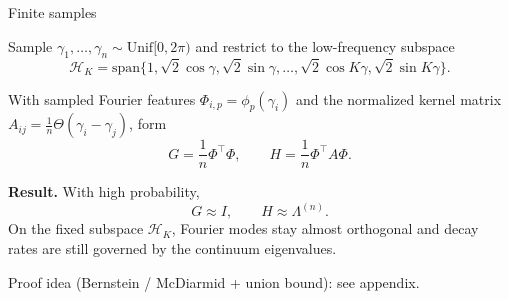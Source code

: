 \documentclass[10pt,aspectratio=169]{beamer}
\begin{document}
\begin{frame}{Finite samples}

	Sample \(\gamma_1,\dots,\gamma_n\sim\mathrm{Unif}[0,2\pi)\) and restrict to the low-frequency subspace
	\[
		\mathcal H_K=\mathrm{span}\{1,\sqrt{2}\cos\gamma,\sqrt{2}\sin\gamma,\ldots,
		\sqrt{2}\cos K\gamma,\sqrt{2}\sin K\gamma\}.
	\]

	\pause
	With sampled Fourier features \(\Phi_{i,p}=\phi_p(\gamma_i)\) and the normalized kernel matrix
	\(A_{ij}=\tfrac1n\Theta(\gamma_i-\gamma_j)\), form
	\[
		G=\frac1n\Phi^\top\Phi,
		\qquad
		H=\frac1n\Phi^\top A\Phi .
	\]

	\pause
	\textbf{Result.} With high probability,
	\[
		G\approx I,
		\qquad
		H\approx \Lambda^{(n)}.
	\]
	On the fixed subspace \(\mathcal H_K\), Fourier modes stay almost orthogonal and decay rates are still
	governed by the continuum eigenvalues.

	\medskip
	{\footnotesize Proof idea (Bernstein / McDiarmid + union bound): see appendix.}


\end{frame}
\end{document}
